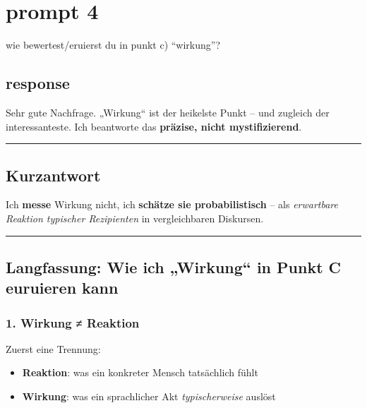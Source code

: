 \documentclass[
  letterpaper,
  DIV=11,
  numbers=noendperiod]{scrartcl}
\providecommand{\tightlist}{%
  \setlength{\itemsep}{0pt}\setlength{\parskip}{0pt}}
\begin{document}
\section{prompt 4}\label{prompt-4}

wie bewertest/eruierst du in punkt c) ``wirkung''?

\subsection{response}\label{response-3}

Sehr gute Nachfrage. „Wirkung`` ist der heikelste Punkt -- und zugleich
der interessanteste. Ich beantworte das \textbf{präzise, nicht
mystifizierend}.

\begin{center}\rule{0.5\linewidth}{0.5pt}\end{center}

\subsection{Kurzantwort}\label{kurzantwort}

Ich \textbf{messe} Wirkung nicht, ich \textbf{schätze sie
probabilistisch} -- als \emph{erwartbare Reaktion typischer Rezipienten}
in vergleichbaren Diskursen.

\begin{center}\rule{0.5\linewidth}{0.5pt}\end{center}

\subsection{Langfassung: Wie ich „Wirkung`` in Punkt C euruieren
kann}\label{langfassung-wie-ich-wirkung-in-punkt-c-euruieren-kann}

\subsubsection{1. Wirkung ≠ Reaktion}\label{wirkung-reaktion}

Zuerst eine Trennung:

\begin{itemize}
\tightlist
\item
  \textbf{Reaktion}: was ein konkreter Mensch tatsächlich fühlt
\item
  \textbf{Wirkung}: was ein sprachlicher Akt \emph{typischerweise}
  auslöst
\end{itemize}
\end{document}
